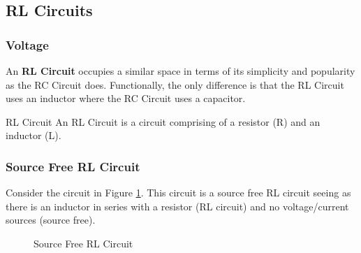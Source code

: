 \documentclass[12pt]{article}
\begin{document}
\subsection{RL Circuits}
\label{ssec:rlCircuits}

\subsubsection{Voltage}
\label{sssec:sfrlcVoltage}

An \textbf{RL Circuit} occupies a similar space in terms of its simplicity and popularity as the RC Circuit does. Functionally, the only difference is that the RL Circuit uses an inductor where the RC Circuit uses a capacitor.

\begin{definition}{RL Circuit}
  An RL Circuit is a circuit comprising of a resistor (R) and an inductor (L).
\end{definition}

\subsubsection{Source Free RL Circuit}
\label{sssec:sourceFreeRLCircuit}

Consider the circuit in Figure \ref{fig:027}. This circuit is a source free RL circuit seeing as there is an inductor in series with a resistor (RL circuit) and no voltage/current sources (source free).

\begin{figure}[H]
  \centering
  
  \caption{Source Free RL Circuit}
  \label{fig:027}
\end{figure}
\end{document}

